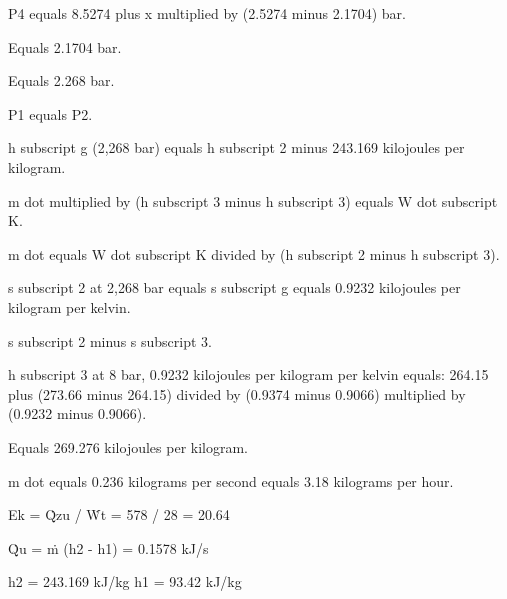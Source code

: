 P4 equals 8.5274 plus x multiplied by (2.5274 minus 2.1704) bar.  

Equals 2.1704 bar.  

Equals 2.268 bar.  

P1 equals P2.

h subscript g (2,268 bar) equals h subscript 2 minus 243.169 kilojoules per kilogram.  

m dot multiplied by (h subscript 3 minus h subscript 3) equals W dot subscript K.  

m dot equals W dot subscript K divided by (h subscript 2 minus h subscript 3).  

s subscript 2 at 2,268 bar equals s subscript g equals 0.9232 kilojoules per kilogram per kelvin.  

s subscript 2 minus s subscript 3.  

h subscript 3 at 8 bar, 0.9232 kilojoules per kilogram per kelvin equals:  
264.15 plus (273.66 minus 264.15) divided by (0.9374 minus 0.9066) multiplied by (0.9232 minus 0.9066).  

Equals 269.276 kilojoules per kilogram.  

m dot equals 0.236 kilograms per second equals 3.18 kilograms per hour.

Ek = Q̇zu / Ẇt = 578 / 28 = 20.64  

Q̇u = ṁ (h2 - h1) = 0.1578 kJ/s  

h2 = 243.169 kJ/kg  
h1 = 93.42 kJ/kg